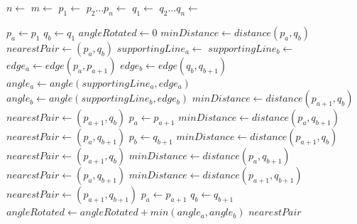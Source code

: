 \documentclass{article}
\begin{document}
\begin{algorithmic}
\State $n \gets $
\State $m \gets $
\State $p_1 \gets $ 
\State $p_2 \dots p_n\gets $ 
\State $q_1 \gets $ 
\State $q_2 \dots q_n\gets $ 

\State $p_a \gets p_1 $
\State $q_b \gets q_1 $
\State $angleRotated \gets 0 $
\State $minDistance \gets distance(p_a, q_b)$
\State $nearestPair \gets (p_a, q_b) $
\State $supportingLine_a \gets $ 
\State $supportingLine_b \gets $ 
	\State $edge_a \gets edge(p_a, p_{a+1})$
	\State $edge_b \gets edge(q_b, q_{b+1})$
	\State $angle_a \gets angle(supportingLine_a, edge_a)$
	\State $angle_b \gets angle(supportingLine_b, edge_b)$
			\State $minDistance\gets distance(p_{a+1}, q_b)$
			\State $nearestPair \gets (p_{a+1}, q_b) $
		\EndIf
		\State $p_a \gets p_{a+1} $
			\State $minDistance \gets distance(p_a, q_{b+1})$
			\State $nearestPair \gets (p_a, q_{b+1}) $
		\EndIf
		\State $p_b \gets q_{b+1} $
	\Else {}
			\State $minDistance \gets distance(p_{a+1}, q_b)$
			\State $nearestPair \gets (p_{a+1}, q_b) $
			\State $minDistance \gets distance(p_a, q_{b+1})$
			\State $nearestPair \gets (p_a, q_{b+1}) $
			\State $minDistance \gets distance(p_{a+1}, q_{b+1})$
			\State $nearestPair \gets (p_{a+1}, q_{b+1}) $
		\EndIf
		\State $p_a \gets p_{a+1} $ 
		\State $q_b \gets q_{b+1} $
	\EndIf
	\State $angleRotated \gets angleRotated + min(angle_a, angle_b)$
\EndWhile
\State \Return $nearestPair$
\end{algorithmic}
\end{document}
